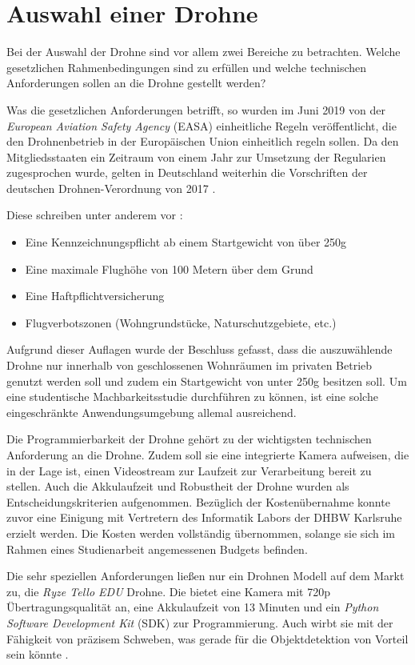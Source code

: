 \section{Auswahl einer Drohne}

Bei der Auswahl der Drohne sind vor allem zwei Bereiche zu betrachten. Welche gesetzlichen Rahmenbedingungen sind zu erfüllen und welche technischen Anforderungen sollen an die Drohne gestellt werden?

Was die gesetzlichen Anforderungen betrifft, so wurden im Juni 2019 von der \textit{European Aviation Safety Agency} (EASA) einheitliche Regeln veröffentlicht, die den Drohnenbetrieb in der Europäischen Union einheitlich regeln sollen. Da den Mitgliedsstaaten ein Zeitraum von einem Jahr zur Umsetzung der Regularien zugesprochen wurde, gelten in Deutschland weiterhin die Vorschriften der deutschen Drohnen-Verordnung von 2017 \cite{EASA.2019}.

Diese schreiben unter anderem vor \cite{Drohnen.de.2020}:
\begin{itemize}
	\item Eine Kennzeichnungspflicht ab einem Startgewicht von über 250g
	\item Eine maximale Flughöhe von 100 Metern über dem Grund
	\item Eine Haftpflichtversicherung
	\item Flugverbotszonen (Wohngrundstücke, Naturschutzgebiete, etc.)
\end{itemize}

Aufgrund dieser Auflagen wurde der Beschluss gefasst, dass die auszuwählende Drohne nur innerhalb von geschlossenen Wohnräumen im privaten Betrieb genutzt werden soll und zudem ein Startgewicht von unter 250g besitzen soll. Um eine studentische Machbarkeitsstudie durchführen zu können, ist eine solche eingeschränkte Anwendungsumgebung allemal ausreichend. 

Die Programmierbarkeit der Drohne gehört zu der wichtigsten technischen Anforderung an die Drohne. Zudem soll sie eine integrierte Kamera aufweisen, die in der Lage ist, einen Videostream zur Laufzeit zur Verarbeitung bereit zu stellen. Auch die Akkulaufzeit und Robustheit der Drohne wurden als Entscheidungskriterien aufgenommen. Bezüglich der Kostenübernahme konnte zuvor eine Einigung mit Vertretern des Informatik Labors der DHBW Karlsruhe erzielt werden. Die Kosten werden vollständig übernommen, solange sie sich im Rahmen eines Studienarbeit angemessenen Budgets befinden.

Die sehr speziellen Anforderungen ließen nur ein Drohnen Modell auf dem Markt zu, die \textit{Ryze Tello EDU} Drohne. Die bietet eine Kamera mit 720p Übertragungsqualität an, eine Akkulaufzeit von 13 Minuten und ein \textit{Python Software Development Kit} (SDK) zur Programmierung. Auch wirbt sie mit der Fähigkeit von präzisem Schweben, was gerade für die Objektdetektion von Vorteil sein könnte \cite{RyzeRobotics.2020}.